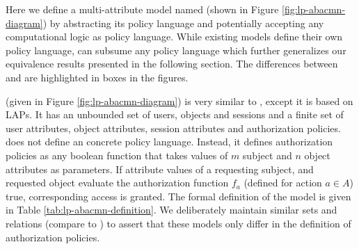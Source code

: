 

	
		
	
	\label{sec:models}
	
	Here we define a multi-attribute \LPModels{} model named \LPMN{} (shown in Figure \ref{fig:lp-abacmn-diagram})  by abstracting its policy language and potentially accepting any computational logic as policy language. While existing \LPModels{} models  define their own policy language, \LPMN{} can subsume any policy language which further generalizes our equivalence results presented in the following section.  The differences between \EPMNModel{} and \LPMN{} are highlighted in boxes in the figures. 
	


		
	
	
	
	


	\label{sec:lpmodels}
	 
	 

	 \LPMN{} (given in Figure \ref{fig:lp-abacmn-diagram}) is very similar to \EPMNModel{}, except it is based on LAPs.  It has an unbounded set of users, objects and sessions and a finite set of user attributes, object attributes, session attributes and authorization policies. \LPMN{} does not define an concrete policy language. Instead, it defines  authorization policies as any boolean function that takes values of $m$ subject and $n$ object attributes as parameters. If attribute values of a requesting subject, and requested object evaluate the authorization function $f_a$ (defined for action $a \in A$) true, corresponding access is granted. The formal definition of the model is given in Table \ref{tab:lp-abacmn-definition}. We deliberately maintain similar sets and relations (compare to \EPMNModel{})  to assert that these models only differ in the definition of authorization policies. 
	 

	
